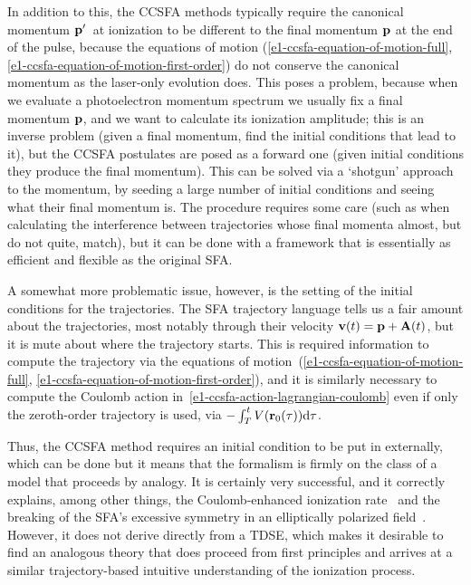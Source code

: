 In addition to this, the CCSFA methods typically require the canonical momentum $\vb{p}'$~at ionization to be different to the final momentum $\vb{p}$ at the end of the pulse, because the equations of motion (\ref{e1-ccsfa-equation-of-motion-full}, \ref{e1-ccsfa-equation-of-motion-first-order}) do not conserve the canonical momentum as the laser-only evolution does. This poses a problem, because when we evaluate a photoelectron momentum spectrum we usually fix a final momentum $\vb{p}$, and we want to calculate its ionization amplitude; this is an inverse problem (given a final momentum, find the initial conditions that lead to it), but the CCSFA postulates are posed as a forward one (given initial conditions they produce the final momentum). This can be solved via a `shotgun' approach to the momentum, by seeding a large number of initial conditions and seeing what their final momentum is. The procedure requires some care (such as when calculating the interference between trajectories whose final momenta almost, but do not quite, match), but it can be done with a framework that is essentially as efficient and flexible as the original SFA.


A somewhat more problematic issue, however, is the setting of the initial conditions for the trajectories. The SFA trajectory language tells us a fair amount about the trajectories, most notably through their velocity $\vb{v}(t)=\vb{p}+\vb{A}(t)$, but it is mute about where the trajectory starts. This is required information to compute the trajectory via the equations of motion~(\ref{e1-ccsfa-equation-of-motion-full}, \ref{e1-ccsfa-equation-of-motion-first-order}), and it is similarly necessary to compute the Coulomb action in~\eqref{e1-ccsfa-action-lagrangian-coulomb} even if only the zeroth-order trajectory is used, via $-\int_{T}^t V(\vb{r}_0(\tau))\mathrm{d}\tau$. 

Thus, the CCSFA method requires an initial condition to be put in externally, which can be done but it means that the formalism is firmly on the class of a model that proceeds by analogy. It is certainly very successful, and it correctly explains, among other things, the Coulomb-enhanced ionization rate~\cite{popruzhenko_ccsfa-arbitrary-frequency_2008} and the breaking of the SFA's excessive symmetry in an elliptically polarized field~\cite{CCSFA_initial_short, CCSFA_initial_full}. However, it does not derive directly from a TDSE, which makes it desirable to find an analogous theory that does proceed from first principles and arrives at a similar trajectory-based intuitive understanding of the ionization process.






